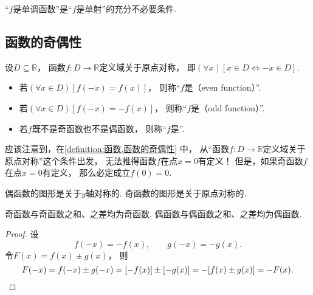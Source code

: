 \begin{proposition}
“\(f\)是单调函数”是“\(f\)是单射”的充分不必要条件.
\end{proposition}

\subsection{函数的奇偶性}
\begin{definition}\label{definition:函数.函数的奇偶性}
设\(D\subseteq\mathbb{R}\)，
函数\(f\colon D\to\mathbb{R}\)定义域关于原点对称，
即\((\forall x)[x \in D \iff -x \in D]\).
\begin{itemize}
	\item 若\((\forall x \in D)
	[f(-x) = f(x)]\)，
	则称“\(f\)是（even function）”.

	\item 若\((\forall x \in D)
	[f(-x) = -f(x)]\)，
	则称“\(f\)是（odd function）”.

	\item 若\(f\)既不是奇函数也不是偶函数，
	则称“\(f\)是”.
\end{itemize}
\end{definition}
\begin{remark}
应该注意到，在\cref{definition:函数.函数的奇偶性} 中，
从“函数\(f\colon D\to\mathbb{R}\)定义域关于原点对称”这个条件出发，
无法推得函数\(f\)在点\(x=0\)有定义！
但是，如果奇函数\(f\)在点\(x=0\)有定义，
那么必定成立\(f(0) = 0\).
\end{remark}

\begin{property}
偶函数的图形是关于\(y\)轴对称的.
奇函数的图形是关于原点对称的.
\end{property}

\begin{property}
奇函数与奇函数之和、之差均为奇函数.
偶函数与偶函数之和、之差均为偶函数.
\begin{proof}
设\begin{equation*}
	f(-x) = -f(x),
	\qquad
	g(-x) = -g(x).
\end{equation*}
令\(F(x) = f(x) \pm g(x)\)，
则\begin{equation*}
	F(-x) = f(-x) \pm g(-x)
	= [-f(x)] \pm [-g(x)]
	= -[f(x) \pm g(x)]
	= -F(x).
	\qedhere
\end{equation*}
\end{proof}
\end{property}

